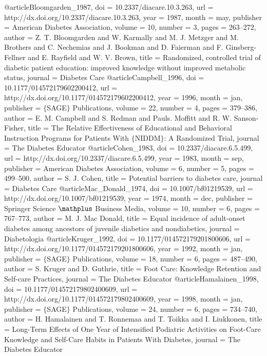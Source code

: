 @article{Bloomgarden_1987,
	doi = {10.2337/diacare.10.3.263},
	url = {http://dx.doi.org/10.2337/diacare.10.3.263},
	year = 1987,
	month = {may},
	publisher = {American Diabetes Association},
	volume = {10},
	number = {3},
	pages = {263--272},
	author = {Z. T. Bloomgarden and W. Karmally and M. J. Metzger and M. Brothers and C. Nechemias and J. Bookman and D. Faierman and F. Ginsberg-Fellner and E. Rayfield and W. V. Brown},
	title = {Randomized, controlled trial of diabetic patient education: improved knowledge without improved metabolic status},
	journal = {Diabetes Care}
}
@article{Campbell_1996,
	doi = {10.1177/014572179602200412},
	url = {http://dx.doi.org/10.1177/014572179602200412},
	year = 1996,
	month = {jan},
	publisher = {$\lbrace$SAGE$\rbrace$ Publications},
	volume = {22},
	number = {4},
	pages = {379--386},
	author = {E. M. Campbell and S. Redman and Pauls. Moffitt and R. W. Sanson-Fisher},
	title = {The Relative Effectiveness of Educational and Behavioral Instruction Programs for Patients With $\lbrace$NIDDM$\rbrace$: A Randomized Trial},
	journal = {The Diabetes Educator}
}
@article{Cohen_1983,
	doi = {10.2337/diacare.6.5.499},
	url = {http://dx.doi.org/10.2337/diacare.6.5.499},
	year = 1983,
	month = {sep},
	publisher = {American Diabetes Association},
	volume = {6},
	number = {5},
	pages = {499--500},
	author = {S. J. Cohen},
	title = {Potential barriers to diabetes care},
	journal = {Diabetes Care}
}
@article{Mac_Donald_1974,
	doi = {10.1007/bf01219539},
	url = {http://dx.doi.org/10.1007/bf01219539},
	year = 1974,
	month = {dec},
	publisher = {Springer Science $\mathplus$ Business Media},
	volume = {10},
	number = {6},
	pages = {767--773},
	author = {M. J. Mac Donald},
	title = {Equal incidence of adult-onset diabetes among ancestors of juvenile diabetics and nondiabetics},
	journal = {Diabetologia}
}
@article{Kruger_1992,
	doi = {10.1177/014572179201800606},
	url = {http://dx.doi.org/10.1177/014572179201800606},
	year = 1992,
	month = {jan},
	publisher = {$\lbrace$SAGE$\rbrace$ Publications},
	volume = {18},
	number = {6},
	pages = {487--490},
	author = {S. Kruger and D. Guthrie},
	title = {Foot Care: Knowledge Retention and Self-care Practices},
	journal = {The Diabetes Educator}
}
@article{Hamalainen_1998,
	doi = {10.1177/014572179802400609},
	url = {http://dx.doi.org/10.1177/014572179802400609},
	year = 1998,
	month = {jan},
	publisher = {$\lbrace$SAGE$\rbrace$ Publications},
	volume = {24},
	number = {6},
	pages = {734--740},
	author = {H. Hamalainen and T. Ronnemaa and T. Toikka and I. Liukkonen},
	title = {Long-Term Effects of One Year of Intensified Podiatric Activities on Foot-Care Knowledge and Self-Care Habits in Patients With Diabetes},
	journal = {The Diabetes Educator}
}
